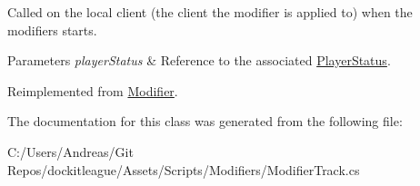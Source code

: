 Called on the local client (the client the modifier is applied to) when the modifiers starts. 


\begin{DoxyParams}{Parameters}
{\em player\+Status} & Reference to the associated \hyperlink{class_player_status}{Player\+Status}.\\
\hline
\end{DoxyParams}


Reimplemented from \hyperlink{class_modifier_a5cce7ec6a5a595265a6bf5a6f7e40eb9}{Modifier}.



The documentation for this class was generated from the following file\+:\begin{DoxyCompactItemize}
\item 
C\+:/\+Users/\+Andreas/\+Git Repos/dockitleague/\+Assets/\+Scripts/\+Modifiers/Modifier\+Track.\+cs\end{DoxyCompactItemize}
